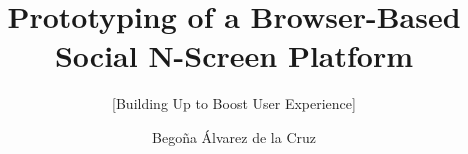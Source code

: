 \documentclass{acm_proc_article-sp}
\begin{document}
\title{Prototyping of a Browser-Based Social N-Screen Platform}
\subtitle{[Building Up to Boost User Experience]
}
%
%
%
%
%

%
\author{
%
%
\alignauthor
Bego\~na \'Alvarez de la Cruz\\
       \\
       \\
       \\
}
\end{document}
